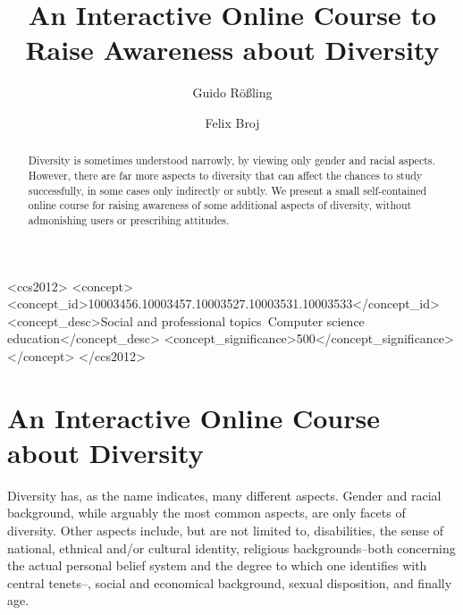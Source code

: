 \documentclass[sigconf]{acmart}
\begin{document}

\title{An Interactive Online Course to Raise Awareness about Diversity}

\author{Guido R\"o\ss{}ling}
\author{Felix Broj}
\begin{CCSXML}
<ccs2012>
<concept>
<concept_id>10003456.10003457.10003527.10003531.10003533</concept_id>
<concept_desc>Social and professional topics~Computer science education</concept_desc>
<concept_significance>500</concept_significance>
</concept>
</ccs2012>
\end{CCSXML}


\begin{abstract}
Diversity is sometimes understood narrowly, by viewing only gender and racial aspects.
However, there are far more aspects to diversity that can affect the chances to study successfully,
in some cases only indirectly or subtly. We present a small self-contained online course for raising
awareness of some additional aspects of diversity, without admonishing users or prescribing attitudes.
\end{abstract}

\maketitle

\section{An Interactive Online Course about Diversity}

Diversity has, as the name indicates, many different aspects. Gender and racial background, while arguably the most
common aspects, are only facets of diversity. Other aspects include, but are not limited to, disabilities, the sense of
national, ethnical and/or cultural identity, religious backgrounds--both concerning the actual personal belief system
and the degree to which one identifies with central tenets--, social and economical background, sexual disposition, and
finally age.
\end{document}
